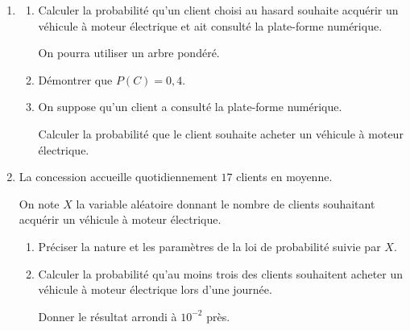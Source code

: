 \begin{enumerate}
\item 
	\begin{enumerate}
		\item Calculer la probabilité qu'un client choisi au hasard souhaite acquérir un véhicule à moteur électrique et ait consulté la plate-forme numérique.
		
On pourra utiliser un arbre pondéré.
		\item Démontrer que $P(C) = 0,4$.
		\item On suppose qu'un client a consulté la plate-forme numérique.
		
Calculer la probabilité que le client souhaite acheter un véhicule à moteur
électrique.
	\end{enumerate}
\item La concession accueille quotidiennement $17$ clients en moyenne.

On note $X$ la variable aléatoire donnant le nombre de clients souhaitant acquérir un véhicule à moteur électrique.
	\begin{enumerate}
		\item Préciser la nature et les paramètres de la loi de probabilité suivie par $X$.
		\item Calculer la probabilité qu'au moins trois des clients souhaitent acheter un véhicule à moteur électrique lors d'une journée.
		
Donner le résultat arrondi à $10^{-2}$ près.
	\end{enumerate}
\end{enumerate}
